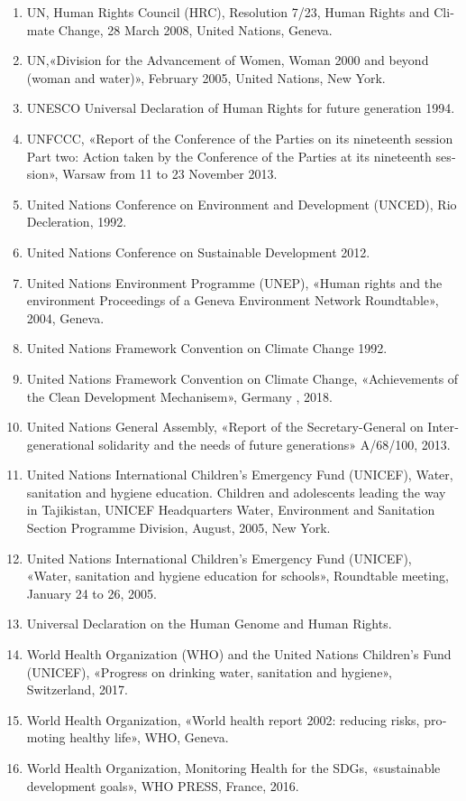 {{{\begin{latin}
\begin{enumerate}
\item UN, Human Rights Council (HRC), Resolution 7/23, Human Rights and Climate Change, 28 March 2008, United Nations, Geneva.
\item UN,«Division for the Advancement of Women, Woman 2000 and beyond (woman and water)», February 2005, United Nations, New York.
\item UNESCO Universal Declaration of Human Rights for future generation 1994.
\item UNFCCC, «Report of the Conference of the Parties on its nineteenth session Part two: Action taken by the Conference of the Parties at its nineteenth session», Warsaw from 11 to 23 November 2013.
\item United Nations Conference on Environment and Development (UNCED), Rio Decleration, 1992.
\item United Nations Conference on Sustainable Development 2012.
\item United Nations Environment Programme (UNEP), «Human rights and the environment Proceedings of a Geneva Environment Network Roundtable», 2004, Geneva.
\item United Nations Framework Convention on Climate Change 1992.
\item United Nations Framework Convention on Climate Change, «Achievements of the Clean Development Mechanisem», Germany , 2018.
\item United Nations General Assembly, «Report of the Secretary-General on Intergenerational solidarity and the needs of future generations» A/68/100, 2013.
\item United Nations International Children's Emergency Fund (UNICEF), Water, sanitation and hygiene education. Children and adolescents leading the way in Tajikistan, UNICEF Headquarters Water, Environment and Sanitation Section Programme Division, August, 2005, New York.
\item United Nations International Children's Emergency Fund (UNICEF), «Water, sanitation and hygiene education for schools», Roundtable meeting, January 24 to 26, 2005.
\item Universal Declaration on the Human Genome and Human Rights.
\item World Health Organization (WHO) and the United Nations Children’s Fund (UNICEF), «Progress on drinking water, sanitation and hygiene», Switzerland, 2017.
\item World Health Organization, «World health report 2002: reducing risks, promoting healthy life», WHO, Geneva.
\item World Health Organization, Monitoring Health for the SDGs, «sustainable development goals», WHO PRESS, France, 2016.





\end{enumerate}
\end{latin}}}}
